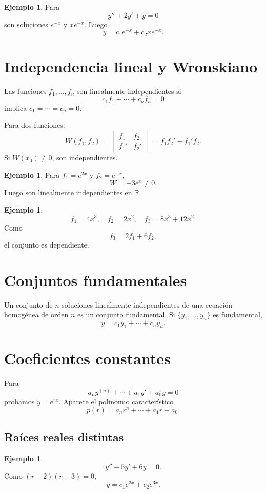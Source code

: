 \documentclass[11pt]{article}
\theoremstyle{definition}
\newtheorem{ejemplo}[teorema]{Ejemplo}
\newcommand{\R}{\mathbb R}
\begin{document}
\begin{ejemplo}
Para
\[
y''+2y'+y=0
\]
son soluciones $e^{-x}$ y $xe^{-x}$. Luego
\[
\boxed{y=c_1e^{-x}+c_2xe^{-x}}.
\]
\end{ejemplo}

\section{Independencia lineal y Wronskiano}
Las funciones $f_1,\ldots,f_n$ son linealmente independientes si
\[
c_1f_1+\cdots+c_nf_n=0
\]
implica $c_1=\cdots=c_n=0$.

Para dos funciones:
\[
W(f_1,f_2)=
\begin{vmatrix}f_1&f_2\\f_1'&f_2'\end{vmatrix}
=f_1f_2'-f_1'f_2.
\]
Si $W(x_0)\ne0$, son independientes.

\begin{ejemplo}
Para $f_1=e^{2x}$ y $f_2=e^{-x}$,
\[
W=-3e^x\ne0.
\]
Luego son linealmente independientes en $\R$.
\end{ejemplo}

\begin{ejemplo}
\[
f_1=4x^3,\quad f_2=2x^2,\quad f_3=8x^3+12x^2.
\]
Como
\[
f_3=2f_1+6f_2,
\]
el conjunto es dependiente.
\end{ejemplo}

\section{Conjuntos fundamentales}
Un conjunto de $n$ soluciones linealmente independientes de una ecuación homogénea de orden $n$ es un conjunto fundamental. Si $\{y_1,\ldots,y_n\}$ es fundamental,
\[
\boxed{y=c_1y_1+\cdots+c_ny_n}.
\]

\section{Coeficientes constantes}
Para
\[
a_ny^{(n)}+\cdots+a_1y'+a_0y=0
\]
probamos $y=e^{rx}$. Aparece el polinomio característico
\[
p(r)=a_nr^n+\cdots+a_1r+a_0.
\]

\subsection{Raíces reales distintas}
\begin{ejemplo}
\[
y''-5y'+6y=0.
\]
Como $(r-2)(r-3)=0$,
\[
\boxed{y=c_1e^{2x}+c_2e^{3x}}.
\]
\end{ejemplo}
\end{document}
